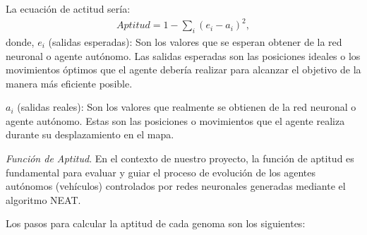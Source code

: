 \documentclass[lettersize, journal]{IEEEtran}
\begin{document}
La ecuación de actitud sería:
\begin{align*}
    Aptitud = 1 - \sum_{i} (e_i - a_i)^2,
\end{align*}
donde, $e_i$ (salidas esperadas): Son los valores que se esperan obtener de la red neuronal o agente autónomo. Las salidas esperadas son las posiciones ideales o los movimientos óptimos que el agente debería realizar para alcanzar el objetivo de la manera más eficiente posible. 

$a_i$ (salidas reales): Son los valores que realmente se obtienen de la red neuronal o agente autónomo. Estas son las posiciones o movimientos que el agente realiza durante su desplazamiento en el mapa.


\textit{Función de Aptitud}. En el contexto de nuestro proyecto, la función de aptitud es fundamental para evaluar y guiar el proceso de evolución de los agentes autónomos (vehículos) controlados por redes neuronales generadas mediante el algoritmo NEAT. 

Los pasos para calcular la aptitud de cada genoma son los siguientes:
\end{document}
